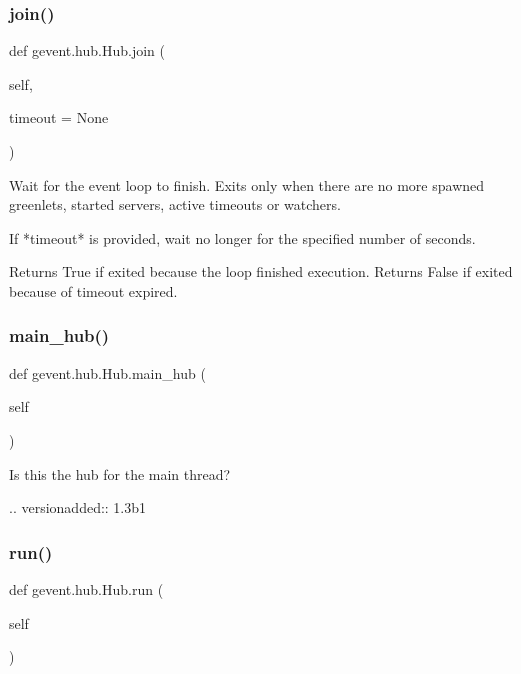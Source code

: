 \subsubsection{\texorpdfstring{join()}{join()}}
{\footnotesize\ttfamily def gevent.\+hub.\+Hub.\+join (\begin{DoxyParamCaption}\item[{}]{self,  }\item[{}]{timeout = {\ttfamily None} }\end{DoxyParamCaption})}

\begin{DoxyVerb}Wait for the event loop to finish. Exits only when there are
no more spawned greenlets, started servers, active timeouts or watchers.

If *timeout* is provided, wait no longer for the specified number of seconds.

Returns True if exited because the loop finished execution.
Returns False if exited because of timeout expired.
\end{DoxyVerb}
 \mbox{\label{classgevent_1_1hub_1_1_hub_a7502a09ef7da152ad84ef12c357e5a1e}} 
\subsubsection{\texorpdfstring{main\+\_\+hub()}{main\_hub()}}
{\footnotesize\ttfamily def gevent.\+hub.\+Hub.\+main\+\_\+hub (\begin{DoxyParamCaption}\item[{}]{self }\end{DoxyParamCaption})}

\begin{DoxyVerb}Is this the hub for the main thread?

.. versionadded:: 1.3b1
\end{DoxyVerb}
 \mbox{\label{classgevent_1_1hub_1_1_hub_a643e6fb069d194a10c8b31bff92d7563}} 
\subsubsection{\texorpdfstring{run()}{run()}}
{\footnotesize\ttfamily def gevent.\+hub.\+Hub.\+run (\begin{DoxyParamCaption}\item[{}]{self }\end{DoxyParamCaption})}

